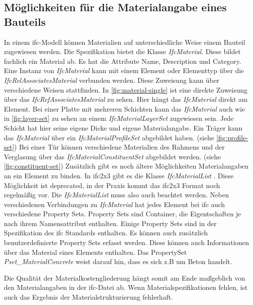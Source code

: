\subsection{Möglichkeiten für die Materialangabe eines Bauteils}
\label{c:basics:ifc:buildingmaterial}
In einem \ac{ifc}-Modell können Materialien auf unterschiedliche Weise einem Bauteil zugewiesen werden. Die Spezifikation bietet die Klasse \textit{IfcMaterial}. Diese bildet fachlich ein Material ab. Es hat die Attribute Name, Description und Category.\citep[vgl.][]{ifc_material} Eine Instanz von \textit{IfcMaterial} kann mit einem Element oder Elementtyp über die \textit{IfcRelAssociatesMaterial} verbunden werden. Diese Zuweisung kann über verschiedene Weisen stattfinden. In \autoref{fig:material-single} ist eine direkte Zuweisung über das \textit{IfcRefAssociatesMaterial} zu sehen. Hier hängt das \textit{IfcMaterial} direkt am Element. 
Bei einer Platte mit mehreren Schichten kann das \textit{IfcMaterial} auch wie in \autoref{fig:layer-set} zu sehen an einem \textit{IfcMaterialLayerSet} zugewiesen sein. Jede Schicht hat hier seine eigene Dicke und eigene Materialangabe. Ein Träger kann das \textit{IfcMaterial} über ein \textit{IfcMaterialProfileSet} abgebildet haben. (siehe \autoref{fig:profile-set}) Bei einer Tür können verschiedene Materialien des Rahmens und der Verglasung über das \textit{IfcMaterialConstituentSet} abgebildet werden. (siehe \autoref{fig:constituent-set}) \citep[vgl.][]{ifc_material_association} Zusätzlich gibt es noch ältere Möglichkeiten Materialangaben an ein Element zu binden. In \ac{ifc2x3} gibt es die Klasse \textit{IfcMaterialList} \citep[vgl.][]{Thomas2007_MaterialList}. Diese Möglichkeit ist deprecated, in der Praxis kommt das \ac{ifc2x3} Format noch regelmäßig vor. Die \textit{IfcMaterialList} muss also auch beachtet werden. Neben verschiedenen Verbindungen zu \textit{IfcMaterial} hat jedes Element bei \ac{ifc} auch verschiedene Property Sets. Property Sets sind Container, die Eigentschaften je nach ihrem Namensattribut enthalten. Einige Property Sets sind in der Spezifikation des \ac{ifc} Standards enthalten. Es können auch zusätzlich benutzerdefinierte Property Sets erfasst werden. Diese können auch Informationen über das Material eines Elements enthalten. \citep[vgl.][]{ifc_property_set} Das PropertySet \textit{Pset\_MaterialConcrete} weist darauf hin, dass es sich z.B um Beton handelt.

Die Qualität der Materialkostengliederung hängt somit am Ende maßgeblich von den Materialangaben in der \ac{ifc}-Datei ab. Wenn Materialspezifikationen fehlen, ist auch das Ergebnis der Materialstrukturierung fehlerhaft.

